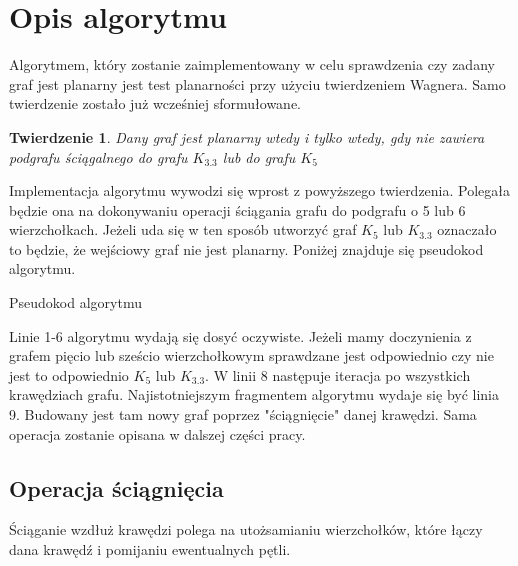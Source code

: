 \documentclass[a4 122pt]{article}
\newtheorem{twierdzenie}{Twierdzenie}
\newenvironment{algorytm}[1][htb]
  {\renewcommand{\algorithmcfname}{Algorytm}%
   \begin{algorithm}[#1]%
  }{\end{algorithm}}
\begin{document}
	\section{Opis algorytmu}	
	Algorytmem, który zostanie zaimplementowany w celu sprawdzenia czy zadany graf jest planarny jest test planarności przy użyciu twierdzeniem Wagnera. 
	Samo twierdzenie zostało już wcześniej sformułowane. 
	\begin{twierdzenie}
	Dany graf jest planarny wtedy i tylko wtedy, gdy nie zawiera podgrafu ściągalnego do grafu $K_{3.3}$ lub do grafu $ K_5 $
	\end{twierdzenie}
	Implementacja algorytmu wywodzi się wprost z powyższego twierdzenia. 
	Polegała będzie ona na dokonywaniu operacji ściągania grafu do podgrafu o 5 lub 6 wierzchołkach.
	Jeżeli uda się w ten sposób utworzyć graf $ K_5 $ lub $K_{3.3}$ oznaczało to będzie, że wejściowy graf nie jest planarny.
	Poniżej znajduje się pseudokod algorytmu.
	
	
	\begin{algorytm}[H]
	\newcommand{\forcond}{$i=0$ \KwTo $n$}
	\caption{Pseudokod algorytmu}
	\end{algorytm}
	
	Linie 1-6 algorytmu wydają się dosyć oczywiste. Jeżeli mamy doczynienia z grafem pięcio lub sześcio wierzchołkowym sprawdzane 
	jest odpowiednio czy nie jest to odpowiednio $K_5$ lub $K_{3.3}$. W linii 8 następuje iteracja po wszystkich krawędziach grafu. 
	Najistotniejszym fragmentem algorytmu wydaje się być linia 9. Budowany jest tam nowy graf poprzez "ściągnięcie" danej krawędzi. 
	Sama operacja zostanie opisana w dalszej części pracy.
	
	\subsection{Operacja ściągnięcia}
		Ściąganie wzdłuż krawędzi polega na utożsamianiu wierzchołków, które łączy dana krawędź i pomijaniu ewentualnych pętli. 
 		
\end{document}
